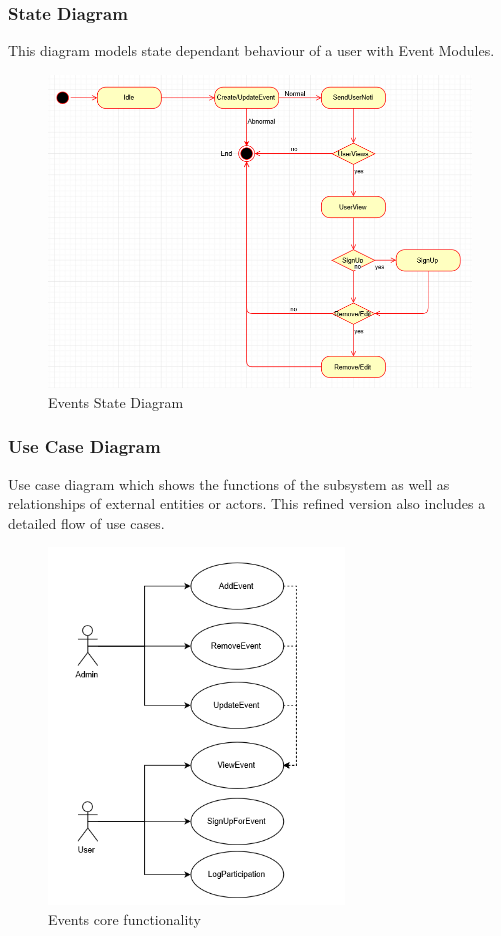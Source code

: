 \subsubsection{State Diagram}
This diagram models state dependant behaviour of a user with Event Modules.
\begin{figure}[H]
		\centering
		\includegraphics[width=\textwidth]{event/StateDiagramTask2.PNG}
		\caption{Events State Diagram}
\end{figure}




\subsubsection{Use Case Diagram}
Use case diagram which shows the functions of the subsystem as well as relationships of external entities or actors. This refined version also includes a detailed flow of use cases.
\begin{figure}[H]
		\centering
		\includegraphics[width=0.7\textwidth]{event/UserCaseTask2.PNG}
		\caption{Events core functionality }
\end{figure}


